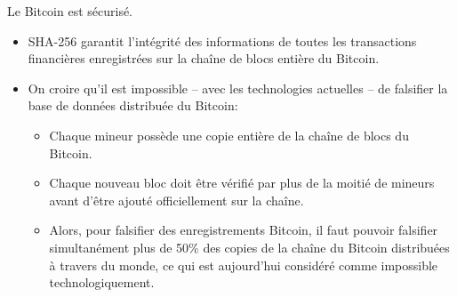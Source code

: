 

\begin{frame}{\LARGE Le Bitcoin est s\'ecuris\'e.}

\normalsize

\begin{itemize}
\item
	SHA-256 garantit l'int\'egrit\'e des informations de
	toutes les transactions financi\`eres enregistr\'ees
	sur la cha\^ine de blocs enti\`ere du Bitcoin.

\vskip 0.4cm
\item
	On croire qu'il est impossible -- avec les technologies actuelles --
	de falsifier la base de donn\'ees {\color{red}distribu\'ee} du Bitcoin:
	\vskip 0.05cm
	\begin{itemize}
	\item
		Chaque mineur poss\`ede une copie enti\`ere de la cha\^ine de blocs du Bitcoin.
	\vskip 0.15cm
	\item
		Chaque nouveau bloc doit \^etre v\'erifi\'e par plus de la moiti\'e de mineurs
		avant d'\^etre ajout\'e officiellement sur la cha\^ine.
	\vskip 0.15cm
	\item
		Alors, pour falsifier des enregistrements Bitcoin, il faut pouvoir falsifier
		{\color{red}simultan\'ement plus de 50\%} des copies
		de la cha\^ine du Bitcoin distribu\'ees \`a travers du monde,
		ce qui est aujourd'hui consid\'er\'e comme impossible technologiquement.
	\end{itemize}
\end{itemize}

\end{frame}
\normalsize

